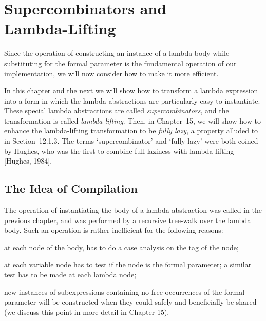 \chapter[Supercombinators and Lambda-Lifting]{Supercombinators and\\Lambda-Lifting}
\vspace{1cm}

\noindent
Since the operation of constructing an instance of a lambda body while
substituting for the formal parameter is the fundamental operation of our
implementation, we will now consider how to make it more efficient.

In this chapter and the next we will show how to transform a lambda
expression into a form in which the lambda abstractions are particularly easy
to instantiate. These special lambda abstractions are called
\textit{supercombinators}, and the transformation is called \textit{lambda-lifting}. Then, in
Chapter~15, we will show how to enhance the lambda-lifting transformation to
be \textit{fully lazy}, a property alluded to in Section~12.1.3. The terms
`supercombinator' and `fully lazy' were both coined by Hughes, who was the
first to combine full laziness with lambda-lifting [Hughes, 1984].

\section{The Idea of Compilation}

The operation of instantiating the body of a lambda abstraction was called
 in the previous chapter, and was performed by a recursive tree-walk
over the lambda body. Such an  operation is rather inefficient for the
following reasons:

\begin{numbered}
    \item at each node of the body,  has to do a case analysis on the tag of
    the node;
    \item at each variable node  has to test if the node is the formal
    parameter; a similar test has to be made at each lambda node;
    \item new instances of subexpressions containing no free occurrences of the
    formal parameter will be constructed when they could safely and
    beneficially be shared (we discuss this point in more detail in Chapter
    15).
\end{numbered}

